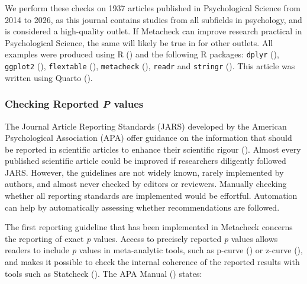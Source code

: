 \documentclass[
  letterpaper,
  12pt]{article}
\begin{document}
We perform these checks on 1937 articles published in Psychological
Science from 2014 to 2026, as this journal contains studies from all
subfields in psychology, and is considered a high-quality outlet. If
Metacheck can improve research practical in Psychological Science, the
same will likely be true in for other outlets. All examples were
produced using R () and the
following R packages: \texttt{dplyr} (), \texttt{ggplot2}
(),
\texttt{flextable} (), \texttt{metacheck} (), \texttt{readr} and \texttt{stringr}
(). This article was written
using Quarto ().

\subsubsection{\texorpdfstring{Checking Reported \emph{P}
values}{Checking Reported P values}}\label{checking-reported-p-values}

The Journal Article Reporting Standards (JARS) developed by the American
Psychological Association (APA) offer guidance on the information that
should be reported in scientific articles to enhance their scientific
rigour (). Almost
every published scientific article could be improved if researchers
diligently followed JARS. However, the guidelines are not widely known,
rarely implemented by authors, and almost never checked by editors or
reviewers. Manually checking whether all reporting standards are
implemented would be effortful. Automation can help by automatically
assessing whether recommendations are followed.

The first reporting guideline that has been implemented in Metacheck
concerns the reporting of exact \emph{p} values. Access to precisely
reported \emph{p} values allows readers to include \emph{p} values in
meta-analytic tools, such as p-curve
() or z-curve
(), and makes
it possible to check the internal coherence of the reported results with
tools such as Statcheck (). The APA Manual
() states:
\end{document}
